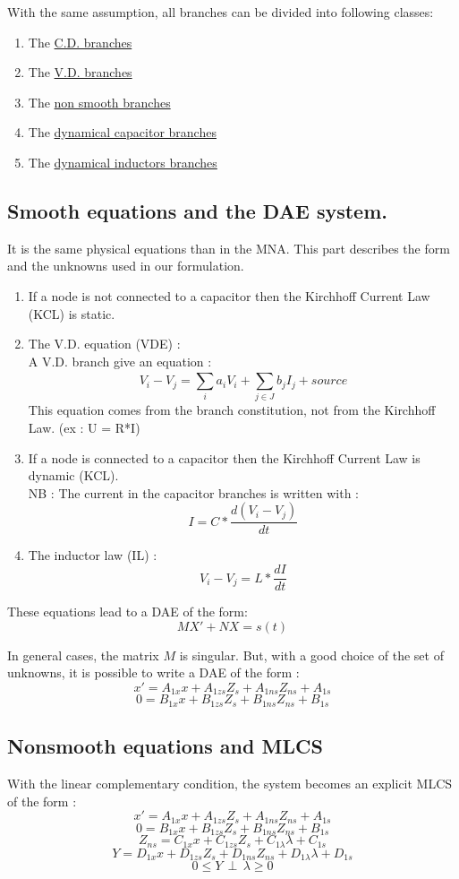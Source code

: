 With the same assumption, all branches can be divided into following classes:\\
\begin{enumerate}
\item The  \underline{C.D. branches} 
\item The  \underline{V.D. branches}
 \item The  \underline{non smooth branches}
 \item The \underline{dynamical capacitor branches}
 \item The \underline{dynamical inductors branches}
\end{enumerate}



\subsection{Smooth equations and the DAE system.}
It is the same physical equations than in the MNA. This part describes the form and the unknowns
used in our formulation.

\begin{enumerate} 
 \item If a node is not connected to a capacitor then the Kirchhoff Current Law (KCL) is static. \\
  \item The V.D. equation (VDE) : \\
    A V.D. branch give an equation :
    \[V_{i}-V_{j} = \sum_{i}^{}a_{i}V_{i} + \sum_{j\in J}^{}b_{j}I_{j} +   source\]
    This equation comes from the branch constitution, not from the Kirchhoff Law. (ex : U = R*I)
  \item If a node is connected to a capacitor then the Kirchhoff Current Law is dynamic (KCL).\\
    NB : The current in the capacitor branches is written with :
    \[I = C*\frac{d(V_{i} - V_{j})}{dt}\]
  \item The inductor law (IL) : 
     \[V_{i} - V_{j} = L*\frac{dI}{dt}\]
\end{enumerate}

These equations lead to a DAE of the form:
\[MX'+NX=s(t)\]

In general cases, the matrix $M$ is singular. But, with a good choice of the set of unknowns, it is possible to write a DAE of the form :
\[x' = A_{1x}x +A_{1zs}Z_{s} + A_{1ns}Z_{ns}+A_{1s}\]
\[0  = B_{1x}x+B_{1zs}Z_{s} + B_{1ns}Z_{ns}+B_{1s}\]

\subsection{Nonsmooth equations and MLCS}
With the linear complementary condition, the system becomes an explicit MLCS of the form :
\[x' = A_{1x}x +A_{1zs}Z_{s} + A_{1ns}Z_{ns}+A_{1s}\]
\[0  = B_{1x}x+B_{1zs}Z_{s} + B_{1ns}Z_{ns}+B_{1s}\]
\[Z_{ns}= C_{1x}x+C_{1zs}Z_{s}+C_{1\lambda}\lambda +C_{1s}\]
\[Y=D_{1x}x +D_{1zs}Z_{s}+D_{1ns}Z_{ns}+D_{1\lambda}\lambda+D_{1s}\]
\[0 \leq Y \, \perp \, \lambda \geq 0\]

\newpage

